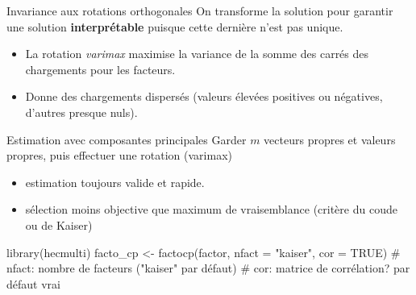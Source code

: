 \documentclass[
  ignorenonframetext,
]{beamer}
\newenvironment{Shaded}{\begin{snugshade}}{\end{snugshade}}
\newcommand{\AttributeTok}[1]{\textcolor[rgb]{0.40,0.45,0.13}{#1}}
\newcommand{\CommentTok}[1]{\textcolor[rgb]{0.37,0.37,0.37}{#1}}
\newcommand{\ConstantTok}[1]{\textcolor[rgb]{0.56,0.35,0.01}{#1}}
\newcommand{\FunctionTok}[1]{\textcolor[rgb]{0.28,0.35,0.67}{#1}}
\newcommand{\NormalTok}[1]{\textcolor[rgb]{0.00,0.23,0.31}{#1}}
\newcommand{\OtherTok}[1]{\textcolor[rgb]{0.00,0.23,0.31}{#1}}
\newcommand{\StringTok}[1]{\textcolor[rgb]{0.13,0.47,0.30}{#1}}
\providecommand{\tightlist}{%
  \setlength{\itemsep}{0pt}\setlength{\parskip}{0pt}}\usepackage{longtable,booktabs,array}
\begin{document}
\begin{frame}{Invariance aux rotations orthogonales}
\protect\hypertarget{invariance-aux-rotations-orthogonales}{}
On transforme la solution pour garantir une solution
\textbf{interprétable} puisque cette dernière n'est pas unique.

\begin{itemize}
\tightlist
\item
  La rotation \emph{varimax} maximise la variance de la somme des carrés
  des chargements pour les facteurs.
\item
  Donne des chargements dispersés (valeurs élevées positives ou
  négatives, d'autres presque nuls).
\end{itemize}
\end{frame}

\begin{frame}[fragile]{Estimation avec composantes principales}
\protect\hypertarget{estimation-avec-composantes-principales}{}
Garder \(m\) vecteurs propres et valeurs propres, puis effectuer une
rotation (varimax)

\begin{itemize}
\tightlist
\item
  estimation toujours valide et rapide.
\item
  sélection moins objective que maximum de vraisemblance (critère du
  coude ou de Kaiser)
\end{itemize}

\begin{Shaded}
\begin{Highlighting}[]
\FunctionTok{library}\NormalTok{(hecmulti)}
\NormalTok{facto\_cp }\OtherTok{\textless{}{-}} \FunctionTok{factocp}\NormalTok{(factor, }
                    \AttributeTok{nfact =} \StringTok{"kaiser"}\NormalTok{, }
                    \AttributeTok{cor =} \ConstantTok{TRUE}\NormalTok{)}
\CommentTok{\# nfact: nombre de facteurs ("kaiser" par défaut)}
\CommentTok{\# cor: matrice de corrélation? par défaut vrai}
\end{Highlighting}
\end{Shaded}
\end{frame}
\end{document}
